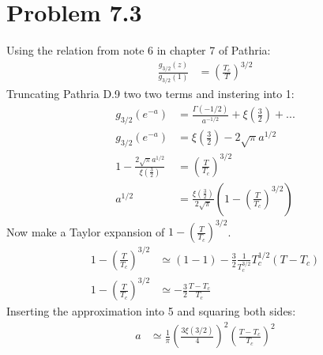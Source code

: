 \documentclass[a4paper,11pt]{article}
\numberwithin{equation}{section}
\begin{document}
\section{Problem 7.3}
Using the relation from note 6 in chapter 7 of Pathria:
\begin{align}
 \frac{g_{3/2}(z)}{g_{3/2}(1)} &= \left(\frac{T_c}{T} \right)^{3/2}
\end{align}
Truncating Pathria D.9 two two terms and instering into 1:
\begin{align}
 g_{3/2}(e^{-a}) &= \frac{\Gamma(-1/2)}{a^{-1/2}}+\xi(\frac{3}{2})+...\\
 g_{3/2}(e^{-a}) &= \xi(\frac{3}{2})-2\sqrt{\pi}a^{1/2} \\
 1-\frac{2\sqrt{\pi}a^{1/2}}{\xi(\frac{3}{2})} &= \left(\frac{T}{T_c} \right)^{3/2}\\
 a^{1/2} &= \frac{\xi(\frac{3}{2})}{2\sqrt{\pi}}\left(1-\left(\frac{T}{T_c}\right)^{3/2} \right)
\end{align}
Now make a Taylor expansion of $1-\left(\frac{T}{T_c}\right)^{3/2}$.
\begin{align}
 1-\left(\frac{T}{T_c}\right)^{3/2} &\simeq (1-1)-\frac{3}{2}\frac{1}{T_c^{3/2}}T_c^{1/2}(T-T_c)\\
 1-\left(\frac{T}{T_c}\right)^{3/2} &\simeq -\frac{3}{2}\frac{T-T_c}{T_c}
\end{align}
Inserting the approximation into 5 and squaring both sides:
\begin{align}
 a &\simeq \frac{1}{\pi}\left(\frac{3\xi(3/2)}{4} \right)^2\left(\frac{T-T_c}{T_c} \right)^2
\end{align}
\end{document}
